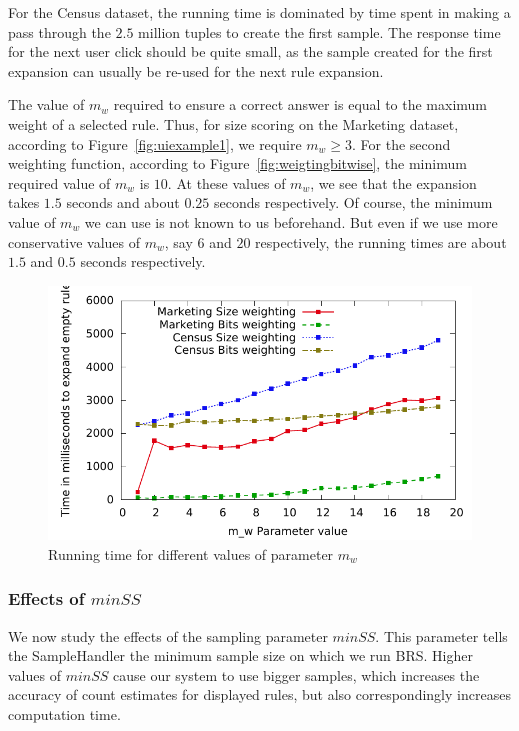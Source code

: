 \documentclass[10pt,journal,compsoc]{IEEEtran}
\begin{document}
For the Census dataset, the running time is dominated by time spent in making a pass through the $2.5$ million tuples to create the first sample. The response time for the next user click should be quite small, as the sample created for the first expansion can usually be re-used for the next rule expansion.

The value of $m_w$ required to ensure a correct answer is equal to the maximum weight of a selected rule. Thus, for size scoring on the Marketing dataset, according to Figure~\ref{fig:uiexample1}, we require $m_w \geq 3$. For the second weighting function, according to Figure~\ref{fig:weigtingbitwise}, the minimum required value of $m_w$ is $10$. At these values of $m_w$, we see that the expansion takes $1.5$ seconds and about $0.25$ seconds respectively. Of course, the minimum value of $m_w$ we can use is not known to us beforehand. But even if we use more conservative values of $m_w$, say $6$ and $20$ respectively, the running times are about $1.5$ and $0.5$ seconds respectively.

\begin{figure}
\centering
  \includegraphics[scale=0.46]{graphs/mw_speed.pdf}%
  \caption{Running time for different values of parameter $m_w$ \label{fig:mw_speed}}
\vspace{-10pt}
\end{figure}

\subsubsection{Effects of $minSS$}
We now study the effects of the sampling parameter $minSS$. This parameter tells the SampleHandler the minimum sample size on which we run BRS. Higher values of $minSS$ cause our system to use bigger samples, which increases the accuracy of count estimates for displayed rules, but also correspondingly increases computation time. 
\end{document}

